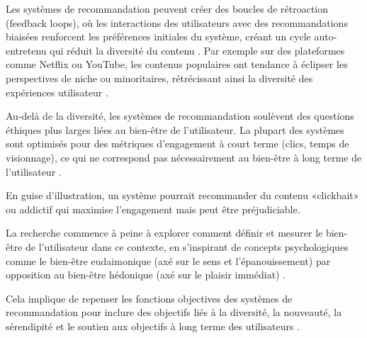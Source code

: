 Les systèmes de recommandation peuvent créer des boucles de rétroaction (feedback loops), où les interactions des utilisateurs avec des recommandations biaisées renforcent les préférences initiales du système, créant un cycle auto-entretenu qui réduit la diversité du contenu \citet{Chen2019Mitigating}. Par exemple sur des plateformes comme Netflix ou YouTube, les contenus populaires ont tendance à éclipser les perspectives de niche ou minoritaires, rétrécissant ainsi la diversité des expériences utilisateur \citet{Chen2019Mitigating}.

Au-delà de la diversité, les systèmes de recommandation soulèvent des questions éthiques plus larges liées au bien-être de l'utilisateur. La plupart des systèmes sont optimisés pour des métriques d'engagement à court terme (clics, temps de visionnage), ce qui ne correspond pas nécessairement au bien-être à long terme de l'utilisateur \citet{Ekstrand2025Evolution}.

En guise d'illustration, un système pourrait recommander du contenu «clickbait» ou addictif qui maximise l'engagement mais peut être préjudiciable. 

La recherche commence à peine à explorer comment définir et mesurer le bien-être de l'utilisateur dans ce contexte, en s'inspirant de concepts psychologiques comme le bien-être eudaimonique (axé sur le sens et l'épanouissement) par opposition au bien-être hédonique (axé sur le plaisir immédiat) \citep{Ryan2001, Huta2013}. 

Cela implique de repenser les fonctions objectives des systèmes de recommandation pour inclure des objectifs liés à la diversité, la nouveauté, la sérendipité et le soutien aux objectifs à long terme des utilisateurs \citet{McNee2016Being}.
